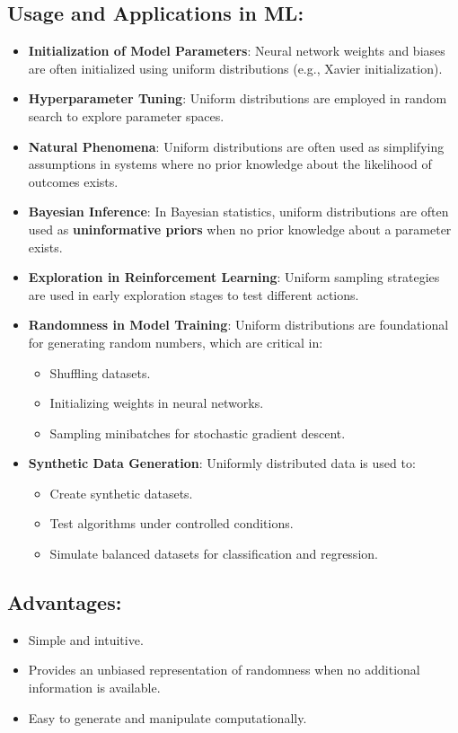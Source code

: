 \subsection*{Usage and Applications in ML:}
\begin{itemize}
    \item \textbf{Initialization of Model Parameters}: Neural network weights and biases are often initialized using uniform distributions (e.g., Xavier initialization).
    \item \textbf{Hyperparameter Tuning}: Uniform distributions are employed in random search to explore parameter spaces.
    \item \textbf{Natural Phenomena}: Uniform distributions are often used as simplifying assumptions in systems where no prior knowledge about the likelihood of outcomes exists.
    \item \textbf{Bayesian Inference}: In Bayesian statistics, uniform distributions are often used as \textbf{uninformative priors} when no prior knowledge about a parameter exists.
    \item \textbf{Exploration in Reinforcement Learning}: Uniform sampling strategies are used in early exploration stages to test different actions.
    \item \textbf{Randomness in Model Training}: Uniform distributions are foundational for generating random numbers, which are critical in:
    \begin{itemize}
        \item Shuffling datasets.
        \item Initializing weights in neural networks.
        \item Sampling minibatches for stochastic gradient descent.
    \end{itemize}
    \item \textbf{Synthetic Data Generation}: Uniformly distributed data is used to:
    \begin{itemize}
        \item Create synthetic datasets.
        \item Test algorithms under controlled conditions.
        \item Simulate balanced datasets for classification and regression.
    \end{itemize}
\end{itemize}

\subsection*{Advantages:}
\begin{itemize}
    \item Simple and intuitive.
    \item Provides an unbiased representation of randomness when no additional information is available.
    \item Easy to generate and manipulate computationally.
\end{itemize}


